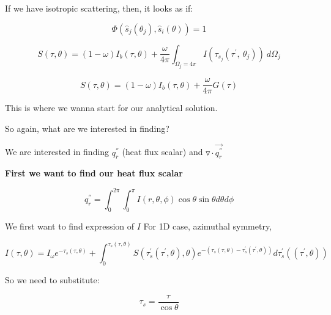 \documentclass[12pt]{article}
\renewcommand{\_}{\kern-1.5pt\textunderscore\kern-1.5pt}
\begin{document}
If we have isotropic scattering, then, it looks as if:\par

 \[  \Phi  \left( \hat{s}_{j} \left(  \theta _{j} \right) ,\hat{s}_{i} \left(  \theta  \right)  \right) =1 \] \par

 \[ S \left(  \tau, \theta  \right) = \left( 1- \omega  \right)  I_{b} \left(  \tau,  \theta  \right) +\frac{ \omega }{4 \pi } \int _{ \Omega _{j}=4 \pi }^{}I \left(  \tau_{s_{j}} \left(  \tau^{'},~ \theta _{j} \right)  \right) ~d \Omega _{j} \] \par

 \[ S \left(  \tau, \theta  \right) = \left( 1- \omega  \right)  I_{b} \left(  \tau,  \theta  \right) +\frac{ \omega }{4 \pi }G \left(  \tau \right)  \] \par

This is where we wanna start for our analytical solution. \par

So again, what are we interested in finding?\par

We are interested in finding  \( q_{r}^{''} \) (heat flux scalar) and  \( \triangledown  \cdot \overrightarrow{q_{r}^{''}} \) \par

\textbf{First we want to find our heat flux scalar}\par

 \[ q_{r}^{''}= \int _{0}^{2 \pi } \int _{0}^{ \pi }I \left( r,  \theta , \phi  \right) \cos  \theta \sin  \theta  d \theta  d \phi  \] \par

We first want to find expression of  \( I \)  For 1D case, azimuthal symmetry,\par


\vspace{\baselineskip}
 \[ I \left(  \tau, \theta  \right) =I_{ \omega }e^{- \tau_{s} \left(  \tau, \theta  \right) }+ \int _{0}^{ \tau_{s} \left(  \tau, \theta  \right) }S \left(  \tau_{s}^{'} \left(  \tau^{'}, \theta  \right) , \theta  \right) e^{- \left(  \tau_{s} \left(  \tau, \theta  \right) - \tau_{s}^{'} \left(  \tau^{'}, \theta  \right)  \right) }d \tau_{s}^{'} \left(  \left(  \tau^{'}, \theta  \right)  \right)  \] \par

So we need to substitute:\par

 \[  \tau_{s}=\frac{ \tau}{\cos  \theta } \] \par
\end{document}
